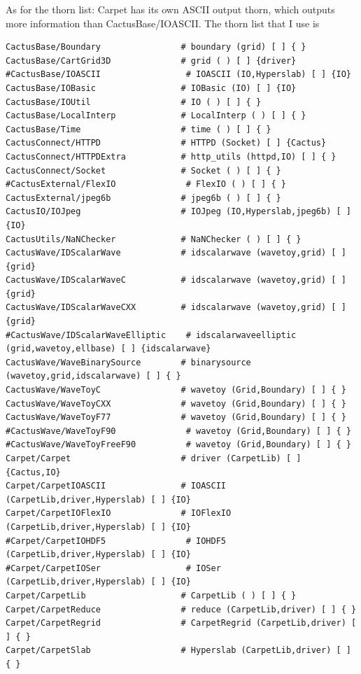 As for the thorn list: Carpet has its own ASCII output thorn, which
outputs more information than CactusBase/IOASCII.  The thorn list that
I use is

\begin{verbatim}
CactusBase/Boundary                # boundary (grid) [ ] { }
CactusBase/CartGrid3D              # grid ( ) [ ] {driver}
#CactusBase/IOASCII                 # IOASCII (IO,Hyperslab) [ ] {IO}
CactusBase/IOBasic                 # IOBasic (IO) [ ] {IO}
CactusBase/IOUtil                  # IO ( ) [ ] { }
CactusBase/LocalInterp             # LocalInterp ( ) [ ] { }
CactusBase/Time                    # time ( ) [ ] { }
CactusConnect/HTTPD                # HTTPD (Socket) [ ] {Cactus}
CactusConnect/HTTPDExtra           # http_utils (httpd,IO) [ ] { }
CactusConnect/Socket               # Socket ( ) [ ] { }
#CactusExternal/FlexIO              # FlexIO ( ) [ ] { }
CactusExternal/jpeg6b              # jpeg6b ( ) [ ] { }
CactusIO/IOJpeg                    # IOJpeg (IO,Hyperslab,jpeg6b) [ ] {IO}
CactusUtils/NaNChecker             # NaNChecker ( ) [ ] { }
CactusWave/IDScalarWave            # idscalarwave (wavetoy,grid) [ ] {grid}
CactusWave/IDScalarWaveC           # idscalarwave (wavetoy,grid) [ ] {grid}
CactusWave/IDScalarWaveCXX         # idscalarwave (wavetoy,grid) [ ] {grid}
#CactusWave/IDScalarWaveElliptic    # idscalarwaveelliptic (grid,wavetoy,ellbase) [ ] {idscalarwave}
CactusWave/WaveBinarySource        # binarysource (wavetoy,grid,idscalarwave) [ ] { }
CactusWave/WaveToyC                # wavetoy (Grid,Boundary) [ ] { }
CactusWave/WaveToyCXX              # wavetoy (Grid,Boundary) [ ] { }
CactusWave/WaveToyF77              # wavetoy (Grid,Boundary) [ ] { }
#CactusWave/WaveToyF90              # wavetoy (Grid,Boundary) [ ] { }
#CactusWave/WaveToyFreeF90          # wavetoy (Grid,Boundary) [ ] { }
Carpet/Carpet                      # driver (CarpetLib) [ ] {Cactus,IO}
Carpet/CarpetIOASCII               # IOASCII (CarpetLib,driver,Hyperslab) [ ] {IO}
Carpet/CarpetIOFlexIO              # IOFlexIO (CarpetLib,driver,Hyperslab) [ ] {IO}
#Carpet/CarpetIOHDF5                # IOHDF5 (CarpetLib,driver,Hyperslab) [ ] {IO}
#Carpet/CarpetIOSer                 # IOSer (CarpetLib,driver,Hyperslab) [ ] {IO}
Carpet/CarpetLib                   # CarpetLib ( ) [ ] { }
Carpet/CarpetReduce                # reduce (CarpetLib,driver) [ ] { }
Carpet/CarpetRegrid                # CarpetRegrid (CarpetLib,driver) [ ] { }
Carpet/CarpetSlab                  # Hyperslab (CarpetLib,driver) [ ] { }
\end{verbatim}


